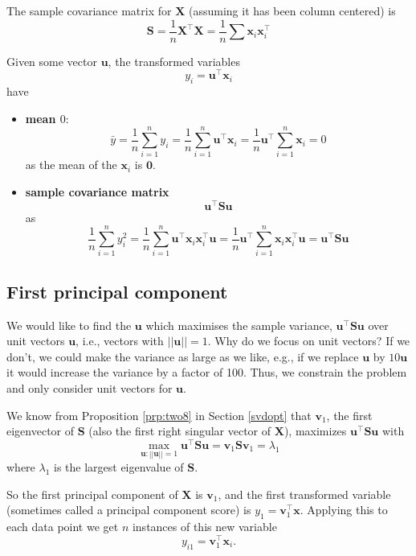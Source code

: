 \documentclass[]{book}
\theoremstyle{definition}
\theoremstyle{definition}
\theoremstyle{definition}
\theoremstyle{remark}
\begin{document}
The sample covariance matrix for \(\mathbf X\) (assuming it has been column centered) is
\[\mathbf S= \frac{1}{n}\mathbf X^\top \mathbf X= \frac{1}{n}\sum \mathbf x_i\mathbf x_i^\top\]

Given some vector \(\mathbf u\), the transformed variables
\[y_i = \mathbf u^\top \mathbf x_i\]
have

\begin{itemize}
\item
  \textbf{mean \(0\)}:
  \[\bar{y}= \frac{1}{n}\sum_{i=1}^n y_i = \frac{1}{n}\sum_{i=1}^n \mathbf u^\top \mathbf x_i =\frac{1}{n} \mathbf u^\top \sum_{i=1}^n  \mathbf x_i = 0\]
  as the mean of the \(\mathbf x_i\) is \(\boldsymbol 0\).
\item
  \textbf{sample covariance matrix} \[\mathbf u^\top \mathbf S\mathbf u\]
  as
  \[\frac{1}{n} \sum_{i=1}^n y_i^2 = \frac{1}{n} \sum_{i=1}^n \mathbf u^\top \mathbf x_i \mathbf x_i^\top\mathbf u= \frac{1}{n}\mathbf u^\top \sum_{i=1}^n  \mathbf x_i \mathbf x_i^\top \mathbf u= \mathbf u^\top \mathbf S\mathbf u
  \]
\end{itemize}

\hypertarget{first-principal-component}{%
\subsection{First principal component}\label{first-principal-component}}

We would like to find the \(\mathbf u\) which maximises the sample variance, \(\mathbf u^\top \mathbf S\mathbf u\) over unit vectors \(\mathbf u\), i.e., vectors with \(||\mathbf u||=1\). Why do we focus on unit vectors? If we don't, we could make the variance as large as we like, e.g., if we replace \(\mathbf u\) by \(10\mathbf u\) it would increase the variance by a factor of 100. Thus, we constrain the problem and only consider unit vectors for \(\mathbf u\).

We know from Proposition \ref{prp:two8} in Section \ref{svdopt} that \(\mathbf v_1\), the first eigenvector of \(\mathbf S\) (also the first right singular vector of \(\mathbf X\)), maximizes \(\mathbf u^\top \mathbf S\mathbf u\) with
\[  \max_{\mathbf u: ||\mathbf u||=1} \mathbf u^\top \mathbf S\mathbf u= \mathbf v_1 \mathbf S\mathbf v_1 =\lambda_1\]
where \(\lambda_1\) is the largest eigenvalue of \(\mathbf S\).

So the first principal component of \(\mathbf X\) is \(\mathbf v_1\), and the first transformed variable (sometimes called a principal component score) is \(y_1 = \mathbf v_1 ^\top \mathbf x\).
Applying this to each data point we get \(n\) instances of this new variable
\[y_{i1} = \mathbf v_1 ^\top \mathbf x_i.\]
\end{document}
